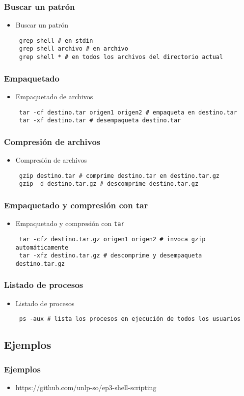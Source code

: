 \begin{frame}[fragile]
  \frametitle{Buscar un patrón}
  \begin{itemize}
    \item Buscar un patrón
   \begin{lstlisting}
 grep shell # en stdin
 grep shell archivo # en archivo
 grep shell * # en todos los archivos del directorio actual
   \end{lstlisting}
  \end{itemize}
\end{frame}

\begin{frame}[fragile]
  \frametitle{Empaquetado}
  \begin{itemize}
    \item Empaquetado de archivos
   \begin{lstlisting}
 tar -cf destino.tar origen1 origen2 # empaqueta en destino.tar
 tar -xf destino.tar # desempaqueta destino.tar
   \end{lstlisting}
  \end{itemize}
\end{frame}

\begin{frame}[fragile]
  \frametitle{Compresión de archivos}
  \begin{itemize}
    \item Compresión de archivos
   \begin{lstlisting}
 gzip destino.tar # comprime destino.tar en destino.tar.gz
 gzip -d destino.tar.gz # descomprime destino.tar.gz
   \end{lstlisting}
  \end{itemize}
\end{frame}

\begin{frame}[fragile]
  \frametitle{Empaquetado y compresión con tar}
  \begin{itemize}
    \item Empaquetado y compresión con \texttt{tar}
   \begin{lstlisting}
 tar -cfz destino.tar.gz origen1 origen2 # invoca gzip automáticamente
 tar -xfz destino.tar.gz # descomprime y desempaqueta destino.tar.gz
   \end{lstlisting}
  \end{itemize}
\end{frame}

\begin{frame}[fragile]
  \frametitle{Listado de procesos}
  \begin{itemize}
    \item Listado de procesos
   \begin{lstlisting}
 ps -aux # lista los procesos en ejecución de todos los usuarios
   \end{lstlisting}
  \end{itemize}
\end{frame}

\subsection{Ejemplos}

\begin{frame}
  \frametitle{Ejemplos}
  \begin{itemize}
    \item https://github.com/unlp-so/ep3-shell-scripting
  \end{itemize}
\end{frame}
